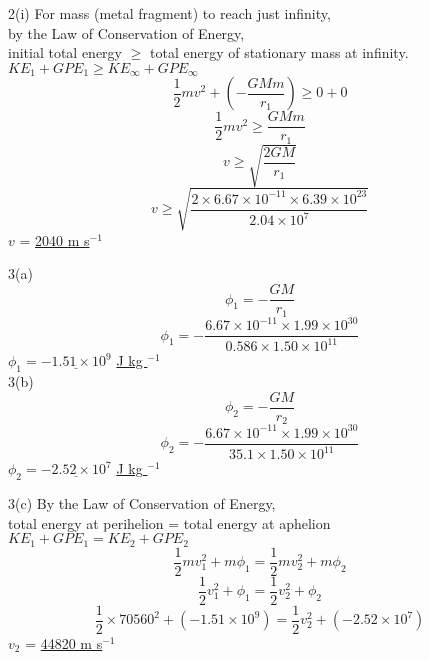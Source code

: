 \documentclass[10pt]{beamer}
\begin{document}
\begin{frame}
2(i) For mass (metal fragment) to reach just infinity,\\
by the Law of Conservation of Energy,\\
initial total energy $\ge$ total energy of stationary mass at infinity.\\
$ KE_1 + GPE_1 \ge KE_{\infty} + GPE_{\infty} $ \\
\[\frac{1}{2}mv^2 +  \left( -\frac{GMm}{r_1} \right) \ge 0 + 0  \]
\[\frac{1}{2}mv^2 \ge  \frac{GMm}{r_1} \]
\[ v \ge \sqrt{\frac{2GM}{r_1}}    \]
\[ v \ge \sqrt{\frac{2 \times 6.67 \times 10^{-11} \times 6.39 \times 10^{23}}{2.04 \times 10^7}}    \]
$v$ = \underline{2040 m s$^{-1}$} \\
\end{frame} 


\begin{frame}
3(a)
\[\phi_1 = -\frac{GM}{r_1}  \]
\[\phi_1 = -\frac{6.67 \times 10^{-11} \times 1.99 \times 10^{30}}{0.586 \times 1.50 \times 10^{11}}  \]
\vspace{10pt}
$ \phi_1 = \underline{-1.51 \times 10^9} $ \underline{J kg $^{-1}$} \\
\vspace{10pt}
3(b)
\[\phi_2 = -\frac{GM}{r_2}  \]
\[\phi_2 = -\frac{6.67 \times 10^{-11} \times 1.99 \times 10^{30}}{35.1 \times 1.50 \times 10^{11}}  \]
\vspace{10pt}
$ \phi_2 = \underline{-2.52 \times 10^7} $ \underline{J kg $^{-1}$ }\\
\end{frame}

\begin{frame}
3(c)
By the Law of Conservation of Energy,\\
total energy at perihelion = total energy at aphelion \\
$KE_1 + GPE_1 = KE_2 + GPE_2 $\\
\[ \frac{1}{2}mv_1^2 + m \phi_1 =  \frac{1}{2}mv_2^2 + m \phi_2   \]
\[ \frac{1}{2}v_1^2 + \phi_1 =  \frac{1}{2}v_2^2 + \phi_2   \]
\[ \frac{1}{2}\times 70560^2 + (-1.51 \times 10^9) =  \frac{1}{2}v_2^2 + (-2.52 \times 10^7)   \]
\vspace{10pt}
$ v_2$ = \underline{44820 m s$^{-1}$} \\

\end{frame}
\end{document}
